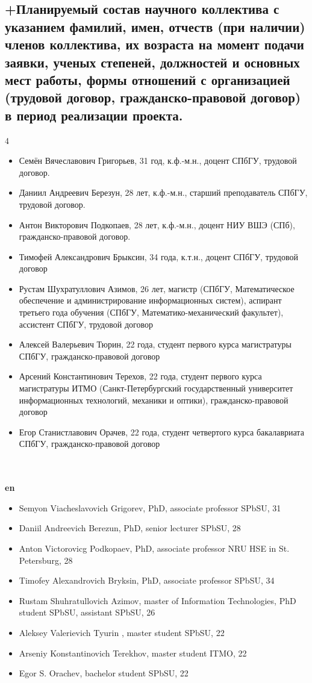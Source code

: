 \documentclass[12pt]{article}  %
\theoremstyle{remark}
\begin{document}
\subsection{+Планируемый состав научного коллектива с указанием фамилий, имен, отчеств (при наличии) членов коллектива, их возраста на момент подачи заявки, ученых степеней, должностей и основных мест работы, формы отношений с организацией (трудовой договор, гражданско-правовой договор) в период реализации проекта.}
4
\begin{itemize}
  \item Семён Вячеславович Григорьев, 31 год, к.ф.-м.н., доцент СПбГУ, трудовой договор.
  \item Даниил Андреевич Березун, 28 лет, к.ф.-м.н., старший преподаватель СПбГУ, трудовой договор.
  \item Антон Викторович Подкопаев, 28 лет, к.ф.-м.н., доцент НИУ ВШЭ (СПб), гражданско-правовой договор.
  \item Тимофей Александрович Брыксин, 34 года, к.т.н., доцент СПбГУ, трудовой договор
  \item Рустам Шухратуллович Азимов, 26 лет, магистр (СПбГУ, Математическое обеспечение и администрирование информационных систем), аспирант третьего года обучения (СПбГУ, Математико-механический факультет), ассистент СПбГУ, трудовой договор
  \item Алексей Валерьевич Тюрин, 22 года, студент первого курса магистратуры СПбГУ, гражданско-правовой договор
  \item Арсений Константинович Терехов, 22 года, студент первого курса магистратуры ИТМО (Санкт-Петербургский государственный университет информационных технологий, механики и оптики), гражданско-правовой договор
  \item Егор Станистлавович Орачев, 22 года, студент четвертого курса бакалавриата СПбГУ, гражданско-правовой договор
\end{itemize}
\\
\\
\textbf{en}
\begin{itemize}
  \item Semyon Viacheslavovich Grigorev, PhD, associate professor SPbSU, 31
  \item Daniil Andreevich Berezun, PhD, senior lecturer SPbSU, 28
  \item Anton Victorovicg Podkopaev, PhD, associate professor NRU HSE in St. Petersburg, 28
  \item Timofey Alexandrovich Bryksin, PhD, associate professor SPbSU, 34
  \item Rustam Shuhratullovich Azimov, master of Information Technologies, PhD student SPbSU, assistant SPbSU, 26 
  \item Aleksey Valerievich Tyurin , master student SPbSU, 22
  \item Arseniy Konstantinovich Terekhov, master student ITMO, 22
  \item Egor S. Orachev, bachelor student SPbSU, 22
\end{itemize}
\end{document}
